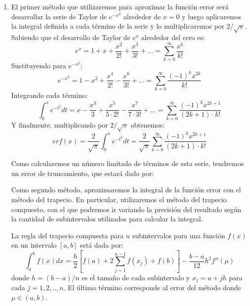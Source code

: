 \documentclass[titlepage,a4paper]{article}
\begin{document}
	\begin{enumerate}[label=(\alph*)]
		\item 
			El primer método que utilizaremos para aproximar la función error\cite{error_function} será desarrollar la serie de Taylor 
			de $e^{-x^2}$ alrededor de $x=0$ y luego aplicaremos la integral definida a cada término de la serie y 
			lo multiplicaremos por $2/\sqrt{\pi}$.\\
			Sabiendo que el desarrollo de Taylor de $e^x$ alrededor del cero es:
				\begin{equation}
					e^x = 1 + x + \frac{x^2}{2!} + \frac{x^3}{3!} + ... = \sum_{k=0}^{\infty}\frac{x^k}{k!}\label{eq:3}
				\end{equation}
			Sustituyendo para $e^{-x^2}$:
				\begin{equation}
					e^{-x^2} = 1 - x^2 + \frac{x^4}{2!} - \frac{x^6}{3!} + ... = \sum_{k=0}^{\infty}\frac{(-1)^k x^{2k}}{k!}
				\end{equation}
			Integrando cada término:
				\begin{equation}
					\int_{0}^{x}e^{-t^2}dt= x - \frac{x^3}{3} + \frac{x^5}{5\cdot2!} - \frac{x^7}{7\cdot3!} + ... = \sum_{k=0}^{\infty}\frac{(-1)^k x^{2k+1}}{(2k+1)\cdot k!}
				\end{equation}
			Y finalmente, multiplicando por $2/\sqrt{\pi}$ obtenemos:
				\begin{equation}
					erf(x) = \frac{2}{\sqrt{\pi}}\int_{0}^{x}e^{-t^2}dt = \frac{2}{\sqrt{\pi}}\sum_{k=0}^{\infty}\frac{(-1)^k x^{2k+1}}{(2k+1)\cdot k!}
				\end{equation}

			Como calcularemos un número limitado de términos de esta serie, tendremos un error de truncamiento, que estará dado por:


			Como segundo método, aproximaremos la integral de la función error con el método del trapecio\cite{burden1}. 
			En particular, utilizaremos el método del trapecio compuesto\cite{burden2}, con el que podremos ir variando 
			la precisión del resultado según la cantidad de subintervalos utilizados para calcular la integral.

			La regla del trapecio compuesta para $n$ subintervalos para una función $f(x)$ en un intervalo $[a,b]$ está dada por:
				\begin{equation}
					\int_{a}^{b}f(x)dx = \frac{h}{2}\left[f(a) + 2\sum_{j=1}^{n-1}f(x_{j})+f(b)\right]-\frac{b-a}{12}h^{2}f''(\mu)\label{eq:12}
				\end{equation}
			donde $h=(b-a)/n$ es el tamaño de cada subintervalo y $x_j = a + jh$ para cada $j=1,2,..,n$. El último 
			término corresponde al error del método donde $\mu \in (a,b)$.


\end{enumerate}
\end{document}
